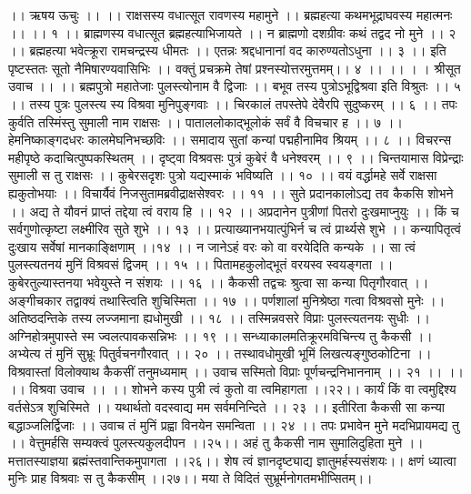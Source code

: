 ।। ऋषय ऊचुः ।। ।।
राक्षसस्य वधात्सूत रावणस्य महामुने ।।
ब्रह्महत्या कथमभूद्राघवस्य महात्मनः ।। ।। १ ।।
ब्राह्मणस्य वधात्सूत ब्रह्महत्याभिजायते ।।
न ब्राह्मणो दशग्रीवः कथं तद्वद नो मुने ।। २ ।।
ब्रह्महत्या भवेत्क्रूरा रामचन्द्रस्य धीमतः ।।
एतन्नः श्रद्दधानानां वद कारुण्यतोऽधुना ।। ३ ।।
इति पृष्टस्ततः सूतो नैमिषारण्यवासिभिः ।।
वक्तुं प्रचक्रमे तेषां प्रश्नस्योत्तरमुत्तमम्।। ४ ।। ।। ।
। श्रीसूत उवाच ।। ।।
ब्रह्मपुत्रो महातेजाः पुलस्त्योनाम वै द्विजाः ।।
बभूव तस्य पुत्रोऽभूद्विश्रवा इति विश्रुतः ।। ५ ।।
तस्य पुत्रः पुलस्त्य स्य विश्रवा मुनिपुङ्गवाः ।।
चिरकालं तपस्तेपे देवैरपि सुदुष्करम् ।। ६ ।।
तपः कुर्वति तस्मिंस्तु सुमाली नाम राक्षसः ।।
पाताललोकाद्भूलोकं सर्वं वै विचचार ह ।। ७ ।।
हेमनिष्काङ्गदधरः कालमेघनिभच्छविः ।।
समादाय सुतां कन्यां पद्महीनामिव श्रियम् ।। ८ ।।
विचरन्स महीपृष्ठे कदाचित्पुष्पकस्थितम् ।।
दृष्ट्वा विश्रवसः पुत्रं कुबेरं वै धनेश्वरम् ।। ९ ।।
चिन्तयामास विप्रेन्द्राः सुमाली स तु राक्षसः ।।
कुबेरसदृशः पुत्रो यद्यस्माकं भविष्यति ।। १० ।।
वयं वर्द्धामहे सर्वे राक्षसा ह्यकुतोभयाः ।।
विचार्यैवं निजसुतामब्रवीद्राक्षसेश्वरः ।। ११ ।।
सुते प्रदानकालोऽद्य तव कैकसि शोभने ।।
अद्य ते यौवनं प्राप्तं तद्देया त्वं वराय हि ।। १२ ।।
अप्रदानेन पुत्रीणां पितरो दुःखमाप्नुयुः ।।
किं च सर्वगुणोत्कृष्टा लक्ष्मीरिव सुते शुभे ।। १३ ।।
प्रत्याख्यानभयात्पुंभिर्न च त्वं प्रार्थ्यसे शुभे ।।
कन्यापितृत्वं दुःखाय सर्वेषां मानकाङ्क्षिणाम् ।।१४ ।।
न जानेऽहं वरः को वा वरयेदिति कन्यके ।।
सा त्वं पुलस्त्यतनयं मुनिं विश्रवसं द्विजम् ।। १५ ।।
पितामहकुलोद्भूतं वरयस्व स्वयङ्गता ।।
कुबेरतुल्यास्तनया भवेयुस्ते न संशयः ।। १६ ।।
कैकसी तद्वचः श्रुत्वा सा कन्या पितृगौरवात् ।।
अङ्गीचकार तद्वाक्यं तथास्त्विति शुचिस्मिता ।। १७ ।।
पर्णशालां मुनिश्रेष्ठा गत्वा विश्रवसो मुनेः ।।
अतिष्ठदन्तिके तस्य लज्जमाना ह्यधोमुखी ।। १८ ।।
तस्मिन्नवसरे विप्राः पुलस्त्यतनयः सुधीः ।।
अग्निहोत्रमुपास्ते स्म ज्वलत्पावकसन्निभः ।। १९ ।।
सन्ध्याकालमतिक्रूरमविचिन्त्य तु कैकसी ।।
अभ्येत्य तं मुनिं सुभ्रूः पितुर्वचनगौरवात् ।। २० ।।
तस्थावधोमुखी भूमिं लिखत्यङ्गुष्ठकोटिना ।।
विश्रवास्तां विलोक्याथ कैकसीं तनुमध्यमाम् ।।
उवाच सस्मितो विप्राः पूर्णचन्द्रनिभाननाम् ।। २१ ।। ।।
।। विश्रवा उवाच ।। ।।
शोभने कस्य पुत्री त्वं कुतो वा त्वमिहागता ।।२२।।
कार्यं किं वा त्वमुद्दिश्य वर्तसेऽत्र शुचिस्मिते ।।
यथार्थतो वदस्वाद्य मम सर्वमनिन्दिते ।। २३ ।।
इतीरिता कैकसी सा कन्या बद्धाञ्जलिर्द्विजाः ।।
उवाच तं मुनिं प्रह्वा विनयेन समन्विता ।। २४ ।।
तपः प्रभावेन मुने मदभिप्रायमद्य तु ।।
वेत्तुमर्हसि सम्यक्त्वं पुलस्त्यकुलदीपन ।।२५।।
अहं तु कैकसी नाम सुमालिदुहिता मुने ।।
मत्तातस्याज्ञया ब्रह्मंस्तवान्तिकमुपागता ।।२६।।
शेष त्वं ज्ञानदृष्ट्याद्य ज्ञातुमर्हस्यसंशयः।।
क्षणं ध्यात्वा मुनिः प्राह विश्रवाः स तु कैकसीम् ।।२७।।
मया ते विदितं सुभ्रूर्मनोगतमभीप्सितम्।।
